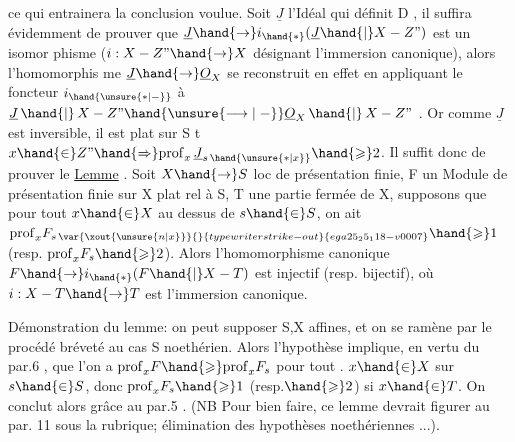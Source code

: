 
ce qui entrainera la conclusion voulue. Soit $\underline{J}$ l'Idéal qui définit
D , il suffira évidemment de prouver que $\underline{J}\hand{\to} i_{\hand{*}}(\underline{J}\hand{|}X-Z")$ est un isomor
phisme ($i:X-Z"\hand{\to} X$ désignant l'immersion canonique), alors l'homomorphis
me $\underline{J}\hand{\to}\underline{O}_X$ se reconstruit en effet en appliquant le foncteur $i_{\hand{\unsure{*|\relbar}}}$ à
$\underline{J}\,\hand{|}\,X-Z" \hand{\unsure{\longrightarrow|\relbar}} \underline{O}_X\,\hand{|}\,X-Z"$ . Or comme $\underline{J}$ est inversible, il est plat sur S t
 $x\hand{\in} Z" \hand{\Rightarrow} \mathrm{prof}_x\,\underline{J}_{s\,\hand{\unsure{*|x}}} \hand{\geqslant} 2$. Il suffit donc de prouver le
\uline{Lemme} . Soit $X\hand{\to} S$ loc de présentation finie, F un Module de présentation
finie sur X plat rel à S, T une partie fermée de X, supposons que pour
tout $x\hand{\in} X$ au dessus de $s\hand{\in} S$, on ait \hand{\unsure{/}} $\mathrm{prof}_x F_{s\,\var{\xout{\unsure{n|x}}}{}{typewriter strike-out}{ega25_25_118-v0007}}\hand{\geqslant} 1$ (resp. $\mathrm{prof}_x F_s \hand{\geqslant} 2$).
Alors l'homomorphisme canonique $F\hand{\to} i_{\hand{*}}(F\hand{|}X-T)$ est injectif (resp.
bijectif), où $i:X-T\hand{\to} T$ est l'immersion canonique.

Démonstration du lemme: on peut supposer S,X affines, et on se
ramène par le procédé bréveté au cas S noethérien. Alors l'hypothèse
implique, en vertu du par.6 , que l'on a $\mathrm{prof}_x F \hand{\geqslant} \mathrm{prof}_x F_s$ pour tout .
$x\hand{\in} X$ sur $s\hand{\in} S$, donc $\mathrm{prof}_x F_s \hand{\geqslant} 1$ (resp.$\hand{\geqslant} 2$) si $x\hand{\in} T$. On conclut alors
grâce au par.5 . (NB Pour bien faire, ce lemme devrait figurer au par.
11 sous la rubrique; élimination des hypothèses noethériennes ...).

